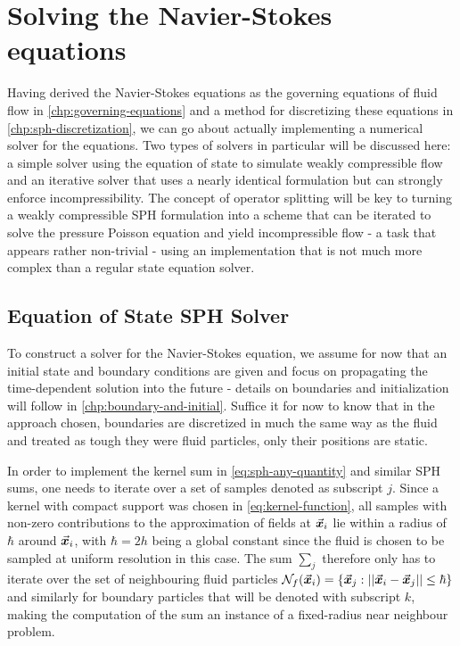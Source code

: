 
\chapter{Solving the Navier-Stokes equations}\label{chp:solvers}

Having derived the Navier-Stokes equations as the governing equations of fluid flow in \autoref{chp:governing-equations} and a method for discretizing these equations in \autoref{chp:sph-discretization}, we can go about actually implementing a numerical solver for the equations. Two types of solvers in particular will be discussed here: a simple solver using the equation of state to simulate weakly compressible flow and an iterative solver that uses a nearly identical formulation but can strongly enforce incompressibility. The concept of operator splitting will be key to turning a weakly compressible SPH formulation into a scheme that can be iterated to solve the pressure Poisson equation and yield incompressible flow - a task that appears rather non-trivial - using an implementation that is not much more complex than a regular state equation solver.

\section{Equation of State SPH Solver}
To construct a solver for the Navier-Stokes equation, we assume for now that an initial state and boundary conditions are given and focus on propagating the time-dependent solution into the future - details on boundaries and initialization will follow in \autoref{chp:boundary-and-initial}. Suffice it for now to know that in the approach chosen, boundaries are discretized in much the same way as the fluid and treated as tough they were fluid particles, only their positions are static.

In order to implement the kernel sum in \autoref{eq:sph-any-quantity} and similar SPH sums, one needs to iterate over a set of samples denoted as subscript $j$. Since a kernel with compact support was chosen in \autoref{eq:kernel-function}, all samples with non-zero contributions to the approximation of fields at $\vec{\bm{x}}_i$ lie within a radius of $\hbar$ around $\vec{\bm{x}}_i$, with $\hbar=2h$ being a global constant since the fluid is chosen to be sampled at uniform resolution in this case. The sum $\sum_j$ therefore only has to iterate over the set of neighbouring fluid particles $\mathcal{N}_{f}(\vec{\bm{x}}_i) = \{\vec{\bm{x}}_j: \left|\left|\vec{\bm{x}}_i-\vec{\bm{x}}_j\right|\right|\leq\hbar\}$ and similarly for boundary particles that will be denoted with subscript $k$, making the computation of the sum an instance of a fixed-radius near neighbour problem\autocite*{tutorial}.

